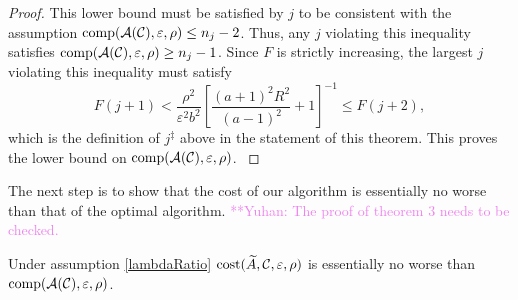 \documentclass[graybox,footinfo]{svmult}
\newcommand{\yuhannote}[1]{ {\textcolor{violet}  {\mbox{**Yuhan:} #1}}}
\begin{document}
\begin{proof}
{This lower bound must be satisfied by $j$ to be consistent with the assumption $\textup{comp}({\mathcal{A}}({\mathcal{C}}),\varepsilon,\rho) \le n_j - 2$.  Thus, any $j$ violating this inequality satisfies $\textup{comp}({\mathcal{A}}({\mathcal{C}}),\varepsilon,\rho) \ge n_j - 1$.  Since $F$ is strictly increasing, the largest $j$ violating this inequality must satisfy
\begin{equation}
F(j+1) < \frac{\rho^2}{\varepsilon^2 b^2}
\left[\frac{(a+1)^{2} R^2 }{(a-1)^2} + 1\right]^{-1} \le F(j+2),
\end{equation}
which is the definition of  $j^\ddagger$ above in the statement of this theorem.  This proves the lower bound on $\textup{comp}({\mathcal{A}}({\mathcal{C}}),\varepsilon,\rho)$. }
\end{proof}

The next step is to show that the cost of our algorithm is essentially no worse than that of the optimal algorithm.
\yuhannote{The proof of theorem 3 needs to be checked.}
\begin{theorem}
\label{thm:CostNoWorse}
Under assumption \eqref{lambdaRatio} $\textup{cost}(\widetilde{A},{\mathcal{C}}, \varepsilon,\rho)$ is essentially no worse than $\textup{comp}({\mathcal{A}}({\mathcal{C}}),\varepsilon,\rho)$. 
\end{theorem}
\end{document}

